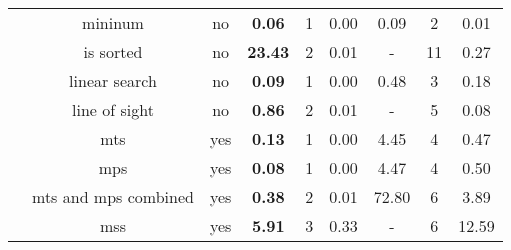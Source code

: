 \begin{table}
{\begin{tabular}[h]{|c|c|c|c|c|c||c|c|c|}
			 & mininum & no & {\bfseries 0.06} & 1 & 0.00 & 0.09 & 2 & 0.01\\ 
			 & is sorted & no & {\bfseries 23.43} & 2 & 0.01 & - & 11 & 0.27\\ 
			 & linear search & no & {\bfseries 0.09} & 1 & 0.00 & 0.48 & 3 & 0.18\\ 
			 & line of sight & no & {\bfseries 0.86} & 2 & 0.01 & - & 5 & 0.08\\ 
			 & mts & yes & {\bfseries 0.13} & 1 & 0.00 & 4.45 & 4 & 0.47\\ 
			 & mps & yes & {\bfseries 0.08} & 1 & 0.00 & 4.47 & 4 & 0.50\\ 
			 & mts and mps combined & yes & {\bfseries 0.38} & 2 & 0.01 & 72.80 & 6 & 3.89\\ 
			 & mss & yes & {\bfseries 5.91} & 3 & 0.33 & - & 6 & 12.59\\ 
			\hline
		\end{tabular}
	}
\end{table}
